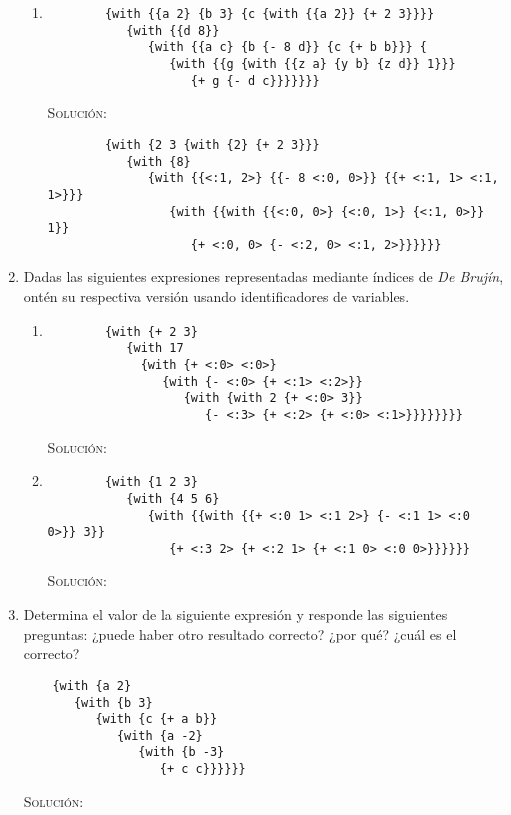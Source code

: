 \documentclass[letterpaper,11pt]{article}
\begin{document}
\begin{enumerate}
\begin{enumerate}
        \item 
        \begin{verbatim}
        {with {{a 2} {b 3} {c {with {{a 2}} {+ 2 3}}}} 
           {with {{d 8}} 
              {with {{a c} {b {- 8 d}} {c {+ b b}}} {
                 {with {{g {with {{z a} {y b} {z d}} 1}}} 
                    {+ g {- d c}}}}}}}
        \end{verbatim}

        \textsc{Solución:}
        \begin{verbatim}
        {with {2 3 {with {2} {+ 2 3}}} 
           {with {8} 
              {with {{<:1, 2>} {{- 8 <:0, 0>}} {{+ <:1, 1> <:1, 1>}}} 
                 {with {{with {{<:0, 0>} {<:0, 1>} {<:1, 0>}} 1}} 
                    {+ <:0, 0> {- <:2, 0> <:1, 2>}}}}}}
        \end{verbatim}
    \end{enumerate}

    \item Dadas las siguientes expresiones representadas mediante índices de 
    \textit{De Brujín}, ontén su respectiva versión usando identificadores de 
    variables.
    \begin{enumerate}
        \item 
        \begin{verbatim}
        {with {+ 2 3} 
           {with 17 
             {with {+ <:0> <:0>} 
                {with {- <:0> {+ <:1> <:2>}} 
                   {with {with 2 {+ <:0> 3}} 
                      {- <:3> {+ <:2> {+ <:0> <:1>}}}}}}}}
        \end{verbatim}

        \textsc{Solución:}

        \item 
        \begin{verbatim}
        {with {1 2 3} 
           {with {4 5 6} 
              {with {{with {{+ <:0 1> <:1 2>} {- <:1 1> <:0 0>}} 3}} 
                 {+ <:3 2> {+ <:2 1> {+ <:1 0> <:0 0>}}}}}}
        \end{verbatim}

        \textsc{Solución:}
    \end{enumerate}

    \item Determina el valor de la siguiente expresión y responde las siguientes 
    preguntas: ¿puede haber otro resultado correcto? ¿por qué? ¿cuál es el 
    correcto? 
    \begin{verbatim}
    {with {a 2} 
       {with {b 3} 
          {with {c {+ a b}} 
             {with {a -2} 
                {with {b -3} 
                   {+ c c}}}}}}
    \end{verbatim}

    \textsc{Solución:}
\end{enumerate}
\end{document}
